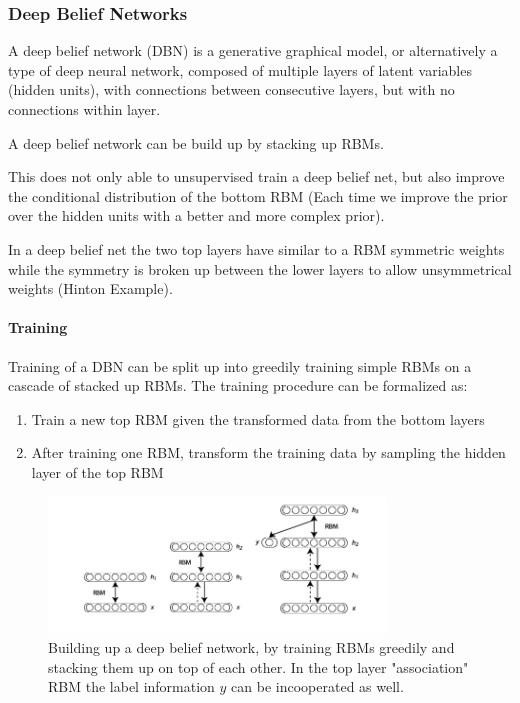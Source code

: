 \subsubsection{Deep Belief Networks}

A deep belief network (DBN) is a generative graphical model, or alternatively a type of deep neural network, composed of multiple layers of latent variables (hidden units), with connections between consecutive layers, but with no connections within layer.

A deep belief network can be build up by stacking up RBMs.

This does not only able to unsupervised train a deep belief net, but also improve the conditional distribution of the bottom RBM (Each time we improve the prior over the hidden units with a better and more complex prior).

In a deep belief net the two top layers have similar to a RBM symmetric weights while the symmetry is broken up between the lower layers to allow unsymmetrical weights (Hinton Example).   

\paragraph{Training} 

Training of a DBN can be split up into greedily training simple RBMs on a cascade of stacked up RBMs.
The training procedure can be formalized as:  
\begin{enumerate}
\item Train a new top RBM given the transformed data from the bottom layers
\item After training one RBM, transform the training data by sampling the hidden layer of the top RBM
\end{enumerate}

\begin{figure}
	\centering
    	\includegraphics[width=0.8\textwidth]{imgs/dbn_stacking.png} 
    \caption{Building up a deep belief network, by training RBMs greedily and stacking them up on top of each other. In the top layer "association" RBM the label information $y$ can be incooperated as well.}
	\label{fig:dbn}
\end{figure}

